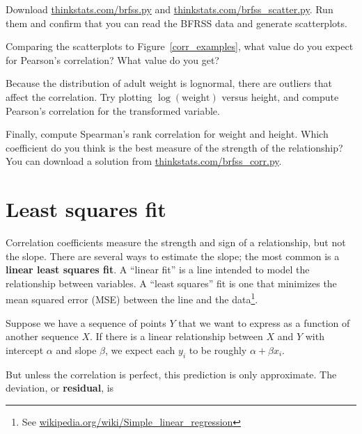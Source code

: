 \documentclass[12pt]{book}
\begin{document}
\begin{ex}


Download \url{thinkstats.com/brfss.py} and
\url{thinkstats.com/brfss_scatter.py}.  Run them and confirm that you
can read the BFRSS data and generate scatterplots.

Comparing the scatterplots to Figure~\ref{corr_examples}, what value
do you expect for Pearson's correlation?  What value do you get?


Because the distribution of adult weight is lognormal, there are
outliers that affect the correlation.  Try plotting
$\log(\mathrm{weight})$ versus height, and compute Pearson's
correlation for the transformed variable.

Finally, compute Spearman's rank correlation for weight and height.
Which coefficient do you think is the best measure of the strength of
the relationship?  You can download a solution from
\url{thinkstats.com/brfss_corr.py}.

\end{ex}


\section{Least squares fit}

\newcommand{\slope}{\beta}
\newcommand{\inter}{\alpha}


Correlation coefficients measure the strength and sign of a
relationship, but not the slope.  There are several ways to estimate
the slope; the most common is a {\bf linear least squares fit}.  A
``linear fit'' is a line intended to model the relationship between
variables.  A ``least squares'' fit is one that minimizes the mean
squared error (MSE) between the line and the data\footnote{See
  \url{wikipedia.org/wiki/Simple_linear_regression}}.

Suppose we have a sequence of points $Y$ that we want to express as a
function of another sequence $X$.  If there is a linear relationship
between $X$ and $Y$ with intercept $\inter$ and slope $\slope$, we
expect each $y_i$ to be roughly $\inter + \slope x_i$.

But unless the correlation is perfect, this prediction is only
approximate.  The deviation, or {\bf residual}, is 
\end{document}
